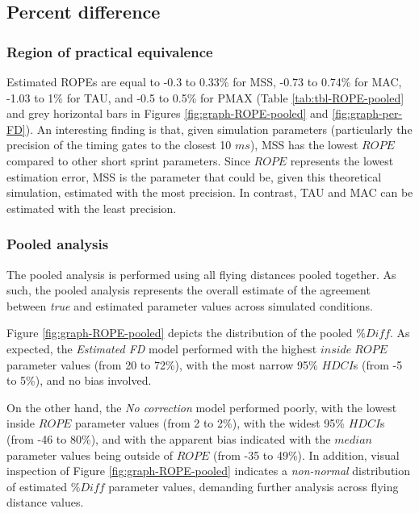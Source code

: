 \documentclass[fleqn,10pt]{wlpeerj} %
\begin{document}
\hypertarget{percent-difference}{%
\subsection{Percent difference}\label{percent-difference}}

\hypertarget{region-of-practical-equivalence}{%
\subsubsection{Region of practical equivalence}\label{region-of-practical-equivalence}}

Estimated ROPEs are equal to -0.3 to 0.33\% for MSS, -0.73 to 0.74\% for MAC, -1.03 to 1\% for TAU, and -0.5 to 0.5\% for PMAX (Table \ref{tab:tbl-ROPE-pooled} and grey horizontal bars in Figures \ref{fig:graph-ROPE-pooled} and \ref{fig:graph-per-FD}). An interesting finding is that, given simulation parameters (particularly the precision of the timing gates to the closest 10 \(ms\)), MSS has the lowest \(ROPE\) compared to other short sprint parameters. Since \(ROPE\) represents the lowest estimation error, MSS is the parameter that could be, given this theoretical simulation, estimated with the most precision. In contrast, TAU and MAC can be estimated with the least precision.

\hypertarget{pooled-analysis}{%
\subsubsection{Pooled analysis}\label{pooled-analysis}}

The pooled analysis is performed using all flying distances pooled together. As such, the pooled analysis represents the overall estimate of the agreement between \emph{true} and estimated parameter values across simulated conditions.

Figure \ref{fig:graph-ROPE-pooled} depicts the distribution of the pooled \(\%Diff\). As expected, the \emph{Estimated FD} model performed with the highest \(inside \; ROPE\) parameter values (from 20 to 72\%), with the most narrow 95\% \(HDCI\)s (from -5 to 5\%), and no bias involved.

On the other hand, the \emph{No correction} model performed poorly, with the lowest inside \(ROPE\) parameter values (from 2 to 2\%), with the widest 95\% \(HDCI\)s (from -46 to 80\%), and with the apparent bias indicated with the \(median\) parameter values being outside of \(ROPE\) (from -35 to 49\%). In addition, visual inspection of Figure \ref{fig:graph-ROPE-pooled} indicates a \emph{non-normal} distribution of estimated \(\%Diff\) parameter values, demanding further analysis across flying distance values.
\end{document}
